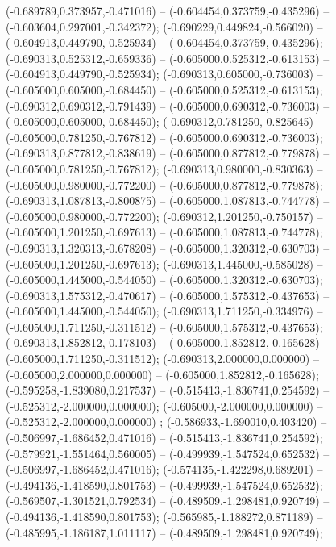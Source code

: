  (-0.689789,0.373957,-0.471016) -- (-0.604454,0.373759,-0.435296) -- (-0.603604,0.297001,-0.342372);
 (-0.690229,0.449824,-0.566020) -- (-0.604913,0.449790,-0.525934) -- (-0.604454,0.373759,-0.435296);
 (-0.690313,0.525312,-0.659336) -- (-0.605000,0.525312,-0.613153) -- (-0.604913,0.449790,-0.525934);
 (-0.690313,0.605000,-0.736003) -- (-0.605000,0.605000,-0.684450) -- (-0.605000,0.525312,-0.613153);
 (-0.690312,0.690312,-0.791439) -- (-0.605000,0.690312,-0.736003) -- (-0.605000,0.605000,-0.684450);
 (-0.690312,0.781250,-0.825645) -- (-0.605000,0.781250,-0.767812) -- (-0.605000,0.690312,-0.736003);
 (-0.690313,0.877812,-0.838619) -- (-0.605000,0.877812,-0.779878) -- (-0.605000,0.781250,-0.767812);
 (-0.690313,0.980000,-0.830363) -- (-0.605000,0.980000,-0.772200) -- (-0.605000,0.877812,-0.779878);
 (-0.690313,1.087813,-0.800875) -- (-0.605000,1.087813,-0.744778) -- (-0.605000,0.980000,-0.772200);
 (-0.690312,1.201250,-0.750157) -- (-0.605000,1.201250,-0.697613) -- (-0.605000,1.087813,-0.744778);
 (-0.690313,1.320313,-0.678208) -- (-0.605000,1.320312,-0.630703) -- (-0.605000,1.201250,-0.697613);
 (-0.690313,1.445000,-0.585028) -- (-0.605000,1.445000,-0.544050) -- (-0.605000,1.320312,-0.630703);
 (-0.690313,1.575312,-0.470617) -- (-0.605000,1.575312,-0.437653) -- (-0.605000,1.445000,-0.544050);
 (-0.690313,1.711250,-0.334976) -- (-0.605000,1.711250,-0.311512) -- (-0.605000,1.575312,-0.437653);
 (-0.690313,1.852812,-0.178103) -- (-0.605000,1.852812,-0.165628) -- (-0.605000,1.711250,-0.311512);
 (-0.690313,2.000000,0.000000) -- (-0.605000,2.000000,0.000000) -- (-0.605000,1.852812,-0.165628);
 (-0.595258,-1.839080,0.217537) -- (-0.515413,-1.836741,0.254592) -- (-0.525312,-2.000000,0.000000);
 (-0.605000,-2.000000,0.000000) -- (-0.525312,-2.000000,0.000000) ;
 (-0.586933,-1.690010,0.403420) -- (-0.506997,-1.686452,0.471016) -- (-0.515413,-1.836741,0.254592);
 (-0.579921,-1.551464,0.560005) -- (-0.499939,-1.547524,0.652532) -- (-0.506997,-1.686452,0.471016);
 (-0.574135,-1.422298,0.689201) -- (-0.494136,-1.418590,0.801753) -- (-0.499939,-1.547524,0.652532);
 (-0.569507,-1.301521,0.792534) -- (-0.489509,-1.298481,0.920749) -- (-0.494136,-1.418590,0.801753);
 (-0.565985,-1.188272,0.871189) -- (-0.485995,-1.186187,1.011117) -- (-0.489509,-1.298481,0.920749);
